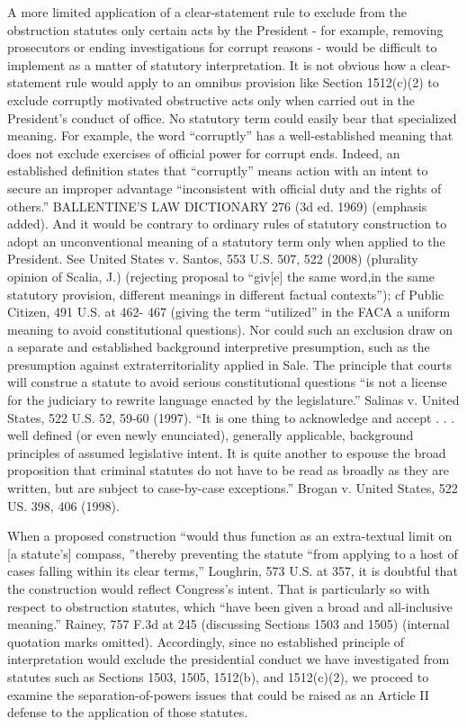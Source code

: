 A more limited application of a clear-statement rule to exclude from the obstruction statutes only certain acts by the President - for example, removing prosecutors or ending investigations for corrupt reasons - would be difficult to implement as a matter of statutory interpretation. 
It is not obvious how a clear-statement rule would apply to an omnibus provision like Section 1512(c)(2) to exclude corruptly motivated obstructive acts only when carried out in the President’s conduct of office. 
No statutory term could easily bear that specialized meaning. 
For example, the word “corruptly” has a well-established meaning that does not exclude exercises of official power for corrupt ends. 
Indeed, an established definition states that “corruptly” means action with an intent to secure an improper advantage “inconsistent with official duty and the rights of others.” BALLENTINE’S LAW DICTIONARY 276 (3d ed. 1969) (emphasis added). 
And it would be contrary to ordinary rules of statutory construction to adopt an unconventional meaning of a statutory term only when applied to the President. 
See United States v. Santos, 553 U.S. 507, 522 (2008) (plurality opinion of Scalia, J.) (rejecting proposal to “giv[e] the same word,in the same statutory provision, different meanings in different factual contexts”); cf Public Citizen, 491 U.S. at 462- 467 (giving the term “utilized” in the FACA a uniform meaning to avoid constitutional questions). 
Nor could such an exclusion draw on a separate and established background interpretive presumption, such as the presumption against extraterritoriality applied in Sale. 
The principle that courts will construe a statute to avoid serious constitutional questions “is not a license for the judiciary to rewrite language enacted by the legislature.” Salinas v. United States, 522 U.S. 52, 59-60 (1997). 
“It is one thing to acknowledge and accept . . . well defined (or even newly enunciated), generally applicable, background principles of assumed legislative intent. 
It is quite another to espouse the broad proposition that criminal statutes do not have to be read as broadly as they are written, but are subject to case-by-case exceptions.” Brogan v. United States, 522 US. 398, 406 (1998). 

When a proposed construction “would thus function as an extra-textual limit on [a statute’s] compass, ”thereby preventing the statute “from applying to a host of cases falling within its clear terms,” Loughrin, 573 U.S. at 357, it is doubtful that the construction would reflect Congress’s intent. 
That is particularly so with respect to obstruction statutes, which “have been given a broad and all-inclusive meaning.” Rainey, 757 F.3d at 245 (discussing Sections 1503 and 1505) (internal quotation marks omitted). 
Accordingly, since no established principle of interpretation would exclude the presidential conduct we have investigated from statutes such as Sections 1503, 1505, 1512(b), and 1512(c)(2), we proceed to examine the separation-of-powers issues that could be raised as an Article II defense to the application of those statutes. 

